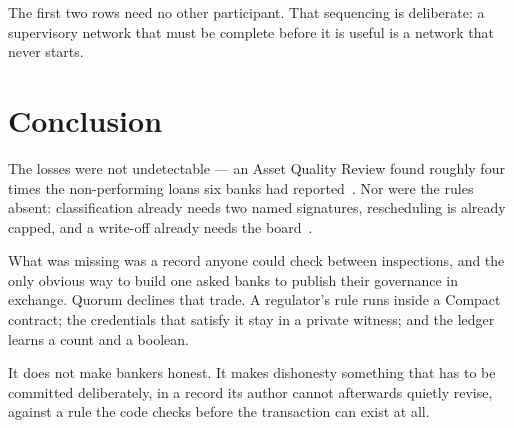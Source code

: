 \documentclass[11pt,a4paper]{article}
\begin{document}
\vspace{4pt}
The first two rows need no other participant. That sequencing is deliberate: a supervisory network that
must be complete before it is useful is a network that never starts.

\section{Conclusion}

The losses were not undetectable --- an Asset Quality Review found roughly four times the non-performing
loans six banks had reported~\cite{aqr}. Nor were the rules absent: classification already needs two named
signatures, rescheduling is already capped, and a write-off already needs the
board~\cite{brpd15,prudential}.

What was missing was a record anyone could check between inspections, and the only obvious way to build
one asked banks to publish their governance in exchange. Quorum declines that trade. A regulator's rule
runs inside a Compact contract; the credentials that satisfy it stay in a private witness; and the ledger
learns a count and a boolean.

It does not make bankers honest. It makes dishonesty something that has to be committed deliberately, in a
record its author cannot afterwards quietly revise, against a rule the code checks before the transaction
can exist at all.
\end{document}
